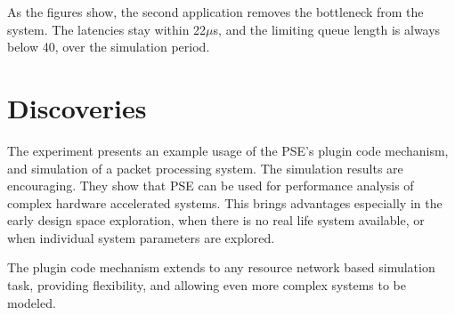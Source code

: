 As the figures show, the second application removes the bottleneck from the system. The latencies stay within 22$\mu$s, and the limiting queue length is always below 40, over the simulation period.

\section{Discoveries}

The experiment presents an example usage of the PSE's plugin code mechanism, and simulation of a packet processing system. The simulation results are encouraging. They show that PSE can be used for performance analysis of complex hardware accelerated systems. This brings advantages especially in the early design space exploration, when there is no real life system available, or when individual system parameters are explored.

The plugin code mechanism extends to any resource network based simulation task, providing flexibility, and allowing even more complex systems to be modeled.

